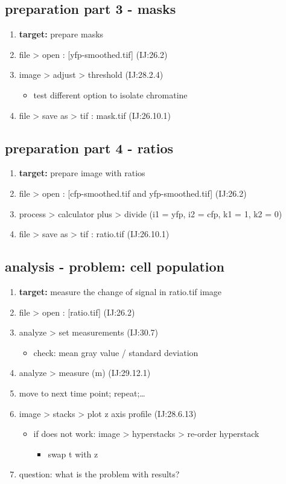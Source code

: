 \documentclass[11pt]{article}
\begin{document}
\subsection{preparation part 3 - masks}
\label{sec-9-3}
\begin{enumerate}
\item \textbf{target:} prepare masks
\item file > open : [yfp-smoothed.tif] (IJ:26.2)
\item image > adjust > threshold (IJ:28.2.4)
\begin{itemize}
\item test different option to isolate chromatine
\end{itemize}
\item file > save as > tif : mask.tif (IJ:26.10.1)
\end{enumerate}

\subsection{preparation part 4 - ratios}
\label{sec-9-4}
\begin{enumerate}
\item \textbf{target:} prepare image with ratios
\item file > open : [cfp-smoothed.tif and yfp-smoothed.tif] (IJ:26.2)
\item process > calculator plus > divide (i1 = yfp, i2 = cfp, k1 = 1, k2
= 0)
\item file > save as > tif : ratio.tif (IJ:26.10.1)
\end{enumerate}

\subsection{analysis - problem: cell population}
\label{sec-9-5}
\begin{enumerate}
\item \textbf{target:} measure the change of signal in ratio.tif image
\item file > open : [ratio.tif] (IJ:26.2)
\item analyze > set measurements (IJ:30.7)
\begin{itemize}
\item check: mean gray value / standard deviation
\end{itemize}
\item analyze > measure (m) (IJ:29.12.1)
\item move to next time point; repeat;\ldots{}
\item image > stacks > plot z axis profile (IJ:28.6.13)
\begin{itemize}
\item if does not work: image > hyperstacks > re-order hyperstack
\begin{itemize}
\item swap t with z
\end{itemize}
\end{itemize}
\item question:  what is the problem with results?
\end{enumerate}
\end{document}
